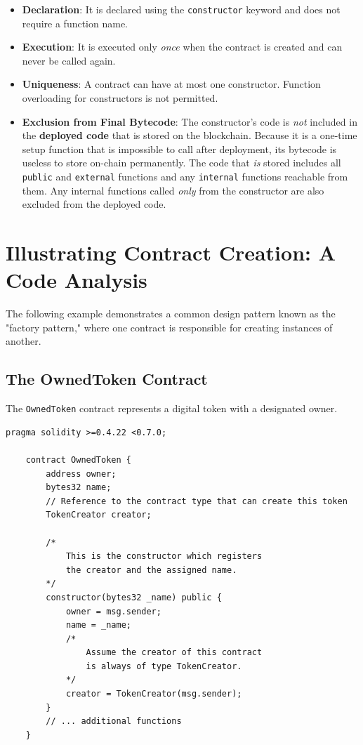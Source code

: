 \documentclass{scrbook}
\begin{document}
\begin{itemize}
    \item \textbf{Declaration}: It is declared using the \texttt{constructor} keyword and does not require a function name.
    
    \item \textbf{Execution}: It is executed only \textit{once} when the contract is created and can never be called again.
    
    \item \textbf{Uniqueness}: A contract can have at most one constructor. Function overloading for constructors is not permitted.
    
    \item \textbf{Exclusion from Final Bytecode}: The constructor's code is \textit{not} included in the \textbf{deployed code} that is stored on the blockchain. Because it is a one-time setup function that is impossible to call after deployment, its bytecode is useless to store on-chain permanently. The code that \textit{is} stored includes all \texttt{public} and \texttt{external} functions and any \texttt{internal} functions reachable from them. Any internal functions called \textit{only} from the constructor are also excluded from the deployed code.
\end{itemize}

\section{Illustrating Contract Creation: A Code Analysis}

The following example demonstrates a common design pattern known as the "factory pattern," where one contract is responsible for creating instances of another.

\subsection{The OwnedToken Contract}

The \texttt{OwnedToken} contract represents a digital token with a designated owner.

\begin{lstlisting}[caption={OwnedToken contract state variables and constructor}]
    pragma solidity >=0.4.22 <0.7.0;
    
    contract OwnedToken {
        address owner;
        bytes32 name;
        // Reference to the contract type that can create this token
        TokenCreator creator;
    
        /*
            This is the constructor which registers
            the creator and the assigned name.
        */
        constructor(bytes32 _name) public {
            owner = msg.sender;
            name = _name;
            /*
                Assume the creator of this contract
                is always of type TokenCreator.
            */
            creator = TokenCreator(msg.sender);
        }
        // ... additional functions
    }
\end{lstlisting}
\end{document}
